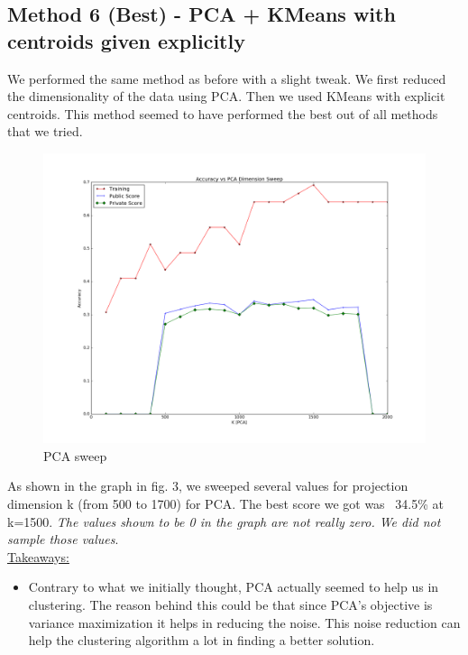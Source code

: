 \documentclass{article}
\begin{document}
\subsection*{Method 6 (Best) - PCA + KMeans with centroids given explicitly}
We performed the same method as before with a slight tweak. We first reduced the dimensionality of the data using PCA. Then we used KMeans with explicit centroids. This method seemed to have performed the best out of all methods that we tried. 

\begin{figure}[H]
\centering
\includegraphics[width=14cm]{PCAsweep.png}
\caption{PCA sweep}
\label{Fig3: PCA sweep}
\end{figure}

As shown in the graph in fig. 3, we sweeped several values for projection dimension k (from 500 to 1700) for PCA. The best score we got was ~34.5\% at k=1500. \textit{The values shown to be 0 in the graph are not really zero. We did not sample those values}.\\

\underline{Takeaways:}\\
\vspace{-0.5cm}
\begin{itemize}
\item Contrary to what we initially thought, PCA actually seemed to help us in clustering. The reason behind this could be that since PCA’s objective is  variance maximization it helps in reducing the noise. This noise reduction can help the clustering algorithm a lot in finding a better solution.
\end{itemize}
\end{document}
